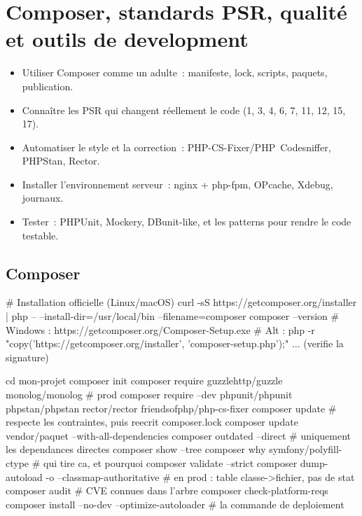 \chapter{Composer, standards PSR, qualit\'e et outils de development}
\label{ch-php-composer}

\begin{objectif}
\begin{itemize}
  \item Utiliser Composer comme un adulte~: manifeste, lock, scripts, paquets, publication.
  \item Conna\^itre les PSR qui changent r\'eellement le code (1, 3, 4, 6, 7, 11, 12, 15, 17).
  \item Automatiser le style et la correction~: PHP-CS-Fixer/PHP~Codesniffer, PHPStan, Rector.
  \item Installer l'environnement serveur~: nginx + php-fpm, OPcache, Xdebug, journaux.
  \item Tester~: PHPUnit, Mockery, DBunit-like, et les patterns pour rendre le code testable.
\end{itemize}
\end{objectif}

\section{Composer}

\begin{terminal}
# Installation officielle (Linux/macOS)
curl -sS https://getcomposer.org/installer | php -- --install-dir=/usr/local/bin --filename=composer
composer --version
# Windows : https://getcomposer.org/Composer-Setup.exe
# Alt : php -r "copy('https://getcomposer.org/installer', 'composer-setup.php');" ... (verifie la signature)

cd mon-projet
composer init
composer require guzzlehttp/guzzle monolog/monolog          # prod
composer require --dev phpunit/phpunit phpstan/phpstan rector/rector friendsofphp/php-cs-fixer
composer update                              # respecte les contraintes, puis reecrit composer.lock
composer update vendor/paquet --with-all-dependencies
composer outdated --direct                   # uniquement les dependances directes
composer show --tree
composer why symfony/polyfill-ctype          # qui tire ca, et pourquoi
composer validate --strict
composer dump-autoload -o --classmap-authoritative    # en prod : table classe->fichier, pas de stat
composer audit                               # CVE connues dans l'arbre
composer check-platform-reqs
composer install --no-dev --optimize-autoloader        # la commande de deploiement
\end{terminal}

